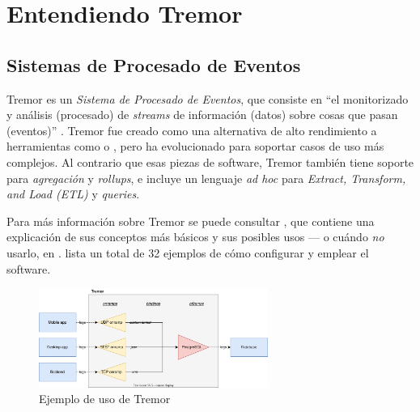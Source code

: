 
\chapter{Entendiendo Tremor}\label{ch:tremor}

\section{Sistemas de Procesado de Eventos}

Tremor es un \emph{Sistema de Procesado de Eventos}, que consiste en ``el
monitorizado y análisis (procesado) de \emph{streams} de información (datos)
sobre cosas que pasan (eventos)'' \cite{luckham2011event}. Tremor fue creado
como una alternativa de alto rendimiento a herramientas como \textcite{logstash}
o \textcite{telegraf}, pero ha evolucionado para soportar casos de uso más
complejos. Al contrario que esas piezas de software, Tremor también tiene
soporte para \emph{agregación} y \emph{rollups}, e incluye un lenguaje \emph{ad
hoc} para \emph{Extract, Transform, and Load (ETL)} y \emph{queries}.

Para más información sobre Tremor se puede consultar \textcite{tremorintro}, que
contiene una explicación de sus conceptos más básicos y sus posibles usos --- o
cuándo \emph{no} usarlo, en \textcite{tremorconstraints}.
\textcite{tremorrecipes} lista un total de 32 ejemplos de cómo configurar y
emplear el software.

\begin{figure}[t]
    \centering
    \includegraphics[width=7.5cm]{./Imagenes/example.svg}
    \caption{Ejemplo de uso de Tremor}%
    \label{fig:example_tremor}
\end{figure}
